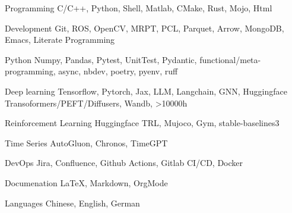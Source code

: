 \documentclass[../cv.tex]{subfiles}
\begin{document}


\begin{cvskills}

  \cvskill
    {Programming} %
    {C/C++, Python, Shell, Matlab, CMake, Rust, Mojo, Html} %

  \cvskill
    {Development} %
    {Git, ROS, OpenCV, MRPT, PCL, Parquet, Arrow, MongoDB, Emacs, Literate Programming} %

  \cvskill
    {Python} %
    {Numpy, Pandas, Pytest, UnitTest, Pydantic, functional/meta-programming, async, nbdev, poetry, pyenv, ruff} %

  \cvskill
    {Deep learning} %
    {Tensorflow, Pytorch, Jax, LLM, Langchain, GNN, Huggingface Transoformers/PEFT/Diffusers, Wandb, >10000h} %

  \cvskill
    {Reinforcement Learning} %
    {Huggingface TRL, Mujoco, Gym, stable-baselines3} %

  \cvskill
    {Time Series} %
    {AutoGluon, Chronos, TimeGPT} %

  \cvskill
    {DevOps} %
    {Jira, Confluence, Github Actions, Gitlab CI/CD, Docker} %

  \cvskill
    {Documenation} %
    {LaTeX, Markdown, OrgMode} %

  \cvskill
    {Languages} %
    {Chinese, English, German} %

\end{cvskills}
\end{document}
